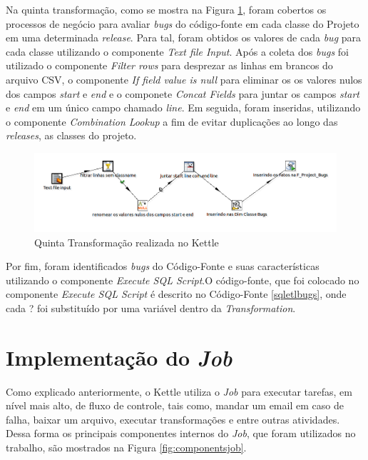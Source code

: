 \begin{apendicesenv}
Na quinta transformação, como se mostra na Figura \ref{fig:quintatransformation}, foram cobertos os processos de negócio para avaliar \textit{bugs} do código-fonte em cada classe do Projeto em uma determinada \textit{release}. Para tal, foram obtidos os valores de cada \textit{bug} para cada classe utilizando o componente \textit{Text file Input}. Após a coleta dos \textit{bugs} foi utilizado o componente \textit{Filter rows} para desprezar as linhas em brancos do arquivo CSV, o componente \textit{If field value is null} para eliminar os os valores nulos dos campos \textit{start} e \textit{end} e o componete \textit{Concat Fields} para juntar os campos \textit{start} e \textit{end} em um único campo chamado \textit{line}. Em seguida, foram inseridas, utilizando o componente \textit{Combination Lookup} a fim de evitar duplicações ao longo das \textit{releases}, as classes do projeto.

\begin{figure}[h!]
\centering
\includegraphics[keepaspectratio=true,scale=0.45]{figuras/figuras_nilton/quintatransformation.png}
\caption{Quinta Transformação realizada no Kettle}
\label{fig:quintatransformation}
\end{figure}
\FloatBarrier


Por fim, foram identificados \textit{bugs} do Código-Fonte e suas características utilizando o componente \textit{Execute SQL Script}.O código-fonte, que foi colocado no componente \textit{Execute SQL Script} é descrito no Código-Fonte \ref{sqletlbugs}, onde cada ? foi substituído por uma variável dentro da \textit{Transformation}.




\section{Implementação do \textit{Job}}

Como explicado anteriormente, o Kettle utiliza o  \textit{Job} para executar tarefas, em nível mais alto, de fluxo de controle, tais como, mandar um email em caso de falha, baixar um arquivo, executar transformações  e entre outras atividades. Dessa forma os principais componentes internos do \textit{Job}, que foram utilizados no trabalho, são mostrados na Figura \ref{fig:componentsjob}. 


\end{apendicesenv}

